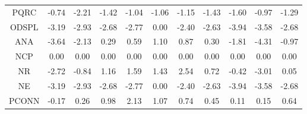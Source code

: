 \begin{longtable}{ | c || c | c | c | c | c | c | c | c | c || c |}
PQRC &  \cellcolor[HTML]{FFEFEF} -0.74 &  \cellcolor[HTML]{FFC7C7} -2.21 &  \cellcolor[HTML]{FFDFDF} -1.42 &  \cellcolor[HTML]{FFE7E7} -1.04 &  \cellcolor[HTML]{FFE7E7} -1.06 &  \cellcolor[HTML]{FFDFDF} -1.15 &  \cellcolor[HTML]{FFD7D7} -1.43 &  \cellcolor[HTML]{FFD7D7} -1.60 &  \cellcolor[HTML]{FFE7E7} -0.97 &  \cellcolor[HTML]{FFDFDF} -1.29 \\
ODSPL &  \cellcolor[HTML]{FFAFAF} -3.19 &  \cellcolor[HTML]{FFB7B7} -2.93 &  \cellcolor[HTML]{FFBFBF} -2.68 &  \cellcolor[HTML]{FFB7B7} -2.77 &  \cellcolor[HTML]{FFFFFF} 0.00 &  \cellcolor[HTML]{FFBFBF} -2.40 &  \cellcolor[HTML]{FFBFBF} -2.63 &  \cellcolor[HTML]{FF9F9F} -3.94 &  \cellcolor[HTML]{FFA7A7} -3.58 &  \cellcolor[HTML]{FFBFBF} -2.68 \\
ANA &  \cellcolor[HTML]{FFA7A7} -3.64 &  \cellcolor[HTML]{FFC7C7} -2.13 &  \cellcolor[HTML]{F7F7FF} 0.29 &  \cellcolor[HTML]{EFEFFF} 0.59 &  \cellcolor[HTML]{E7E7FF} 1.10 &  \cellcolor[HTML]{E7E7FF} 0.87 &  \cellcolor[HTML]{F7F7FF} 0.30 &  \cellcolor[HTML]{FFCFCF} -1.81 &  \cellcolor[HTML]{FF8F8F} -4.31 &  \cellcolor[HTML]{FFE7E7} -0.97 \\
NCP &  \cellcolor[HTML]{FFFFFF} 0.00 &  \cellcolor[HTML]{FFFFFF} 0.00 &  \cellcolor[HTML]{FFFFFF} 0.00 &  \cellcolor[HTML]{FFFFFF} 0.00 &  \cellcolor[HTML]{FFFFFF} 0.00 &  \cellcolor[HTML]{FFFFFF} 0.00 &  \cellcolor[HTML]{FFFFFF} 0.00 &  \cellcolor[HTML]{FFFFFF} 0.00 &  \cellcolor[HTML]{FFFFFF} 0.00 &  \cellcolor[HTML]{FFFFFF} 0.00 \\
NR &  \cellcolor[HTML]{FFB7B7} -2.72 &  \cellcolor[HTML]{FFE7E7} -0.84 &  \cellcolor[HTML]{DFDFFF} 1.16 &  \cellcolor[HTML]{D7D7FF} 1.59 &  \cellcolor[HTML]{D7D7FF} 1.43 &  \cellcolor[HTML]{BFBFFF} 2.54 &  \cellcolor[HTML]{EFEFFF} 0.72 &  \cellcolor[HTML]{FFF7F7} -0.42 &  \cellcolor[HTML]{FFB7B7} -3.01 &  \cellcolor[HTML]{FFFFFF} 0.05 \\
NE &  \cellcolor[HTML]{FFAFAF} -3.19 &  \cellcolor[HTML]{FFB7B7} -2.93 &  \cellcolor[HTML]{FFBFBF} -2.68 &  \cellcolor[HTML]{FFB7B7} -2.77 &  \cellcolor[HTML]{FFFFFF} 0.00 &  \cellcolor[HTML]{FFBFBF} -2.40 &  \cellcolor[HTML]{FFBFBF} -2.63 &  \cellcolor[HTML]{FF9F9F} -3.94 &  \cellcolor[HTML]{FFA7A7} -3.58 &  \cellcolor[HTML]{FFBFBF} -2.68 \\
PCONN &  \cellcolor[HTML]{FFF7F7} -0.17 &  \cellcolor[HTML]{F7F7FF} 0.26 &  \cellcolor[HTML]{E7E7FF} 0.98 &  \cellcolor[HTML]{C7C7FF} 2.13 &  \cellcolor[HTML]{E7E7FF} 1.07 &  \cellcolor[HTML]{EFEFFF} 0.74 &  \cellcolor[HTML]{F7F7FF} 0.45 &  \cellcolor[HTML]{FFFFFF} 0.11 &  \cellcolor[HTML]{FFFFFF} 0.15 &  \cellcolor[HTML]{EFEFFF} 0.64 \\

\end{longtable}
